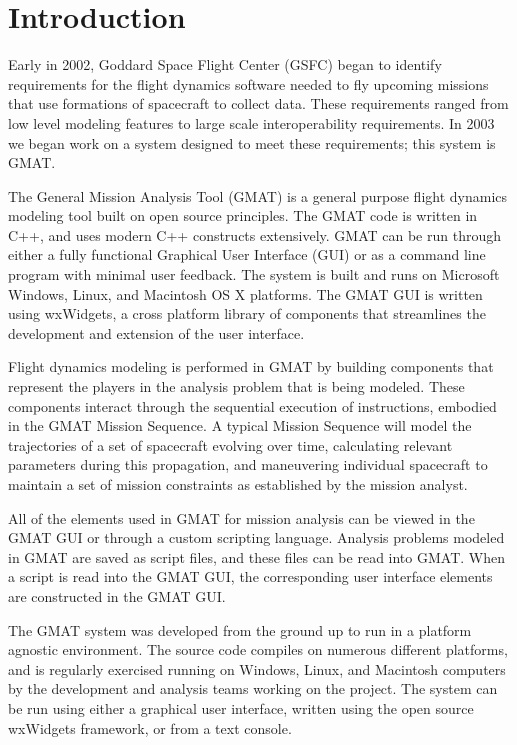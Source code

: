 \chapter{\label{chapter:Introduction}Introduction}


Early in 2002, Goddard Space Flight Center (GSFC) began to identify requirements for the flight
dynamics software needed to fly upcoming missions that use formations of spacecraft to collect data.
 These requirements ranged from low level modeling features to large scale interoperability
requirements.  In 2003 we began work on a system designed to meet these requirements; this
system is GMAT.

The General Mission Analysis Tool (GMAT) is a general purpose flight dynamics modeling tool built on
open source principles. The GMAT code is written in C++, and uses modern C++ constructs extensively.
GMAT can be run through either a fully functional Graphical User Interface (GUI) or as a command
line program with minimal user feedback. The system is built and runs on Microsoft Windows, Linux,
and Macintosh OS X platforms. The GMAT GUI is written using wxWidgets, a cross platform library of
components that streamlines the development and extension of the user interface.

Flight dynamics modeling is performed in GMAT by building components that represent the players in
the analysis problem that is being modeled.  These components interact through the sequential
execution of instructions, embodied in the GMAT Mission Sequence. A typical Mission Sequence will
model the trajectories of a set of spacecraft evolving over time, calculating relevant parameters
during this propagation, and maneuvering individual spacecraft to maintain a set of mission
constraints as established by the mission analyst.

All of the elements used in GMAT for mission analysis can be viewed in the GMAT GUI or through a
custom scripting language. Analysis problems modeled in GMAT are saved as script files, and these
files can be read into GMAT. When a script is read into the GMAT GUI, the corresponding user
interface elements are constructed in the GMAT GUI.

The GMAT system was developed from the ground up to run in a platform agnostic environment.  The
source code compiles on numerous different platforms, and is regularly exercised running on
Windows, Linux, and Macintosh computers by the development and analysis teams working on the
project.  The system can be run using either a graphical user interface, written using the open
source wxWidgets framework, or from a text console.

